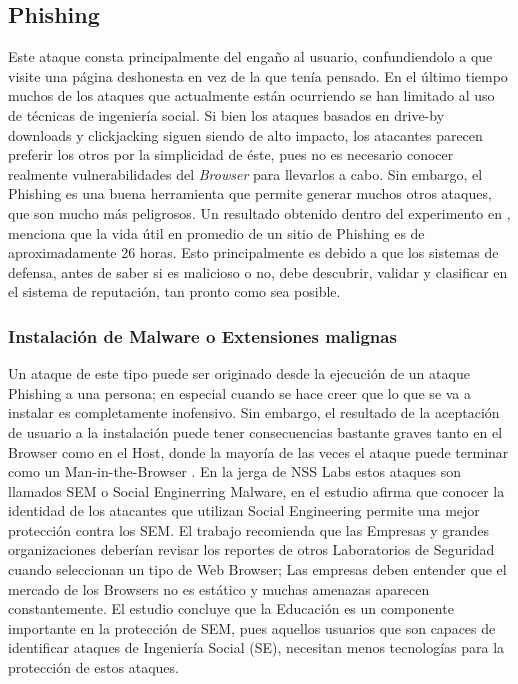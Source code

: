 \subsection{Phishing}
Este ataque consta principalmente del engaño al usuario, confundiendolo a que visite una página deshonesta en vez de la que tenía pensado. En el último tiempo muchos de los ataques que actualmente están ocurriendo se han limitado al uso de técnicas de ingeniería social. Si bien los ataques basados en drive-by downloads y clickjacking siguen siendo de alto impacto, los atacantes parecen preferir los otros por la simplicidad de éste, pues no es necesario conocer realmente vulnerabilidades del \textit{Browser} para llevarlos a cabo. Sin embargo, el Phishing es una buena herramienta que permite generar muchos otros ataques, que son mucho más peligrosos. Un resultado obtenido dentro del experimento en \cite{browSecPhish}, menciona que la vida útil en promedio de un sitio de Phishing es de aproximadamente 26 horas. Esto principalmente es debido a que los sistemas de defensa, antes de saber si es malicioso o no, debe descubrir, validar y clasificar en el sistema de reputación, tan pronto como sea posible.

	\subsubsection{Instalación de Malware o Extensiones malignas}
	Un ataque de este tipo puede ser originado desde la ejecución de un ataque Phishing a una persona; en especial cuando se hace creer que lo que se va a instalar es completamente inofensivo. Sin embargo, el resultado de la aceptación de usuario a la instalación puede tener consecuencias bastante graves tanto en el Browser como en el Host, donde la mayoría de las veces el ataque puede terminar como un Man-in-the-Browser \cite{Utakrit2009, Dougan2012}. En la jerga de NSS Labs estos ataques son llamados SEM o Social Enginerring Malware, en el estudio \cite{rowSecSEMBlock} afirma que conocer la identidad de los atacantes que utilizan Social Engineering permite una mejor protección contra los SEM. El trabajo recomienda que las Empresas y grandes organizaciones deberían revisar los reportes de otros Laboratorios de Seguridad cuando seleccionan un tipo de Web Browser; Las empresas deben entender que el mercado de los Browsers no es estático y muchas amenazas aparecen constantemente. El estudio concluye que la Educación es un componente importante en la protección de SEM, pues aquellos usuarios que son capaces de identificar ataques de Ingeniería Social (SE), necesitan menos tecnologías para la protección de estos ataques.

